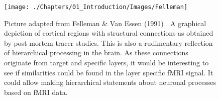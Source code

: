 \begin{figure}[!ht]
	\centering
	\texttt{[image: ./Chapters/01\_Introduction/Images/Felleman]}
	\caption{Picture adapted from Felleman \& Van Essen (1991) \cite{Felleman1991}. A graphical depiction of cortical regions with structural connections as obtained by post mortem tracer studies. This is also a rudimentary reflection of hierarchical processing in the brain. As these connections originate from target and specific layers, it would be interesting to see if similarities could be found in the layer specific fMRI signal. It could allow making hierarchical statements about neuronal processes based on fMRI data.}
	\label{fig:felleman}
\end{figure}